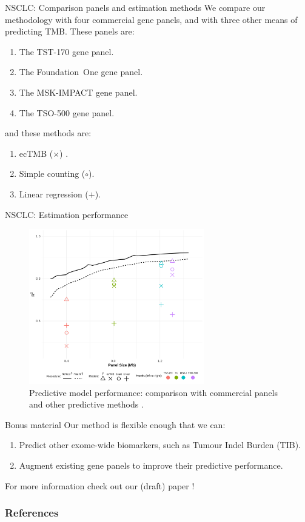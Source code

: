 \documentclass{beamer}
\begin{document}
\begin{frame}{NSCLC: Comparison panels and estimation methods}
We compare our methodology with four commercial gene panels, and with three other means of predicting TMB. These panels are:
\begin{enumerate}
\item The \color{red} TST-170 \color{black} gene panel.
\item The \color{green} Foundation~One \color{black} gene panel.
\item The \color{blue} MSK-IMPACT \color{black} gene panel.
\item The \color{purple} TSO-500 \color{black} gene panel.
\end{enumerate}
and these methods are:
\begin{enumerate}
    \item ecTMB  ($\times$) \citep{yao_ectmb_2020}.
    \item Simple counting ($\circ$).
    \item Linear regression ($+$).
\end{enumerate}

\end{frame}




\begin{frame}{NSCLC: Estimation performance}

\begin{figure}[htbp]
\centering
\includegraphics[width=3in]{figures/originalpanelcomparison.png}
\caption{Predictive model performance: comparison with commercial panels and other predictive methods \citep{bradley_data-driven_2021, yao_ectmb_2020}. \label{fig:7}}
\end{figure}
\end{frame}

\begin{frame}{Bonus material}
Our method is flexible enough that we can:
\begin{enumerate}
    \item Predict other exome-wide biomarkers, such as Tumour Indel Burden (TIB).
    \item Augment existing gene panels to improve their predictive performance.
\end{enumerate}
For more information check out our (draft) paper \cite{bradley_data-driven_2021}!
\end{frame}

\appendix
\begin{frame}[allowframebreaks]
        \frametitle{References}
        
\end{frame}
\end{document}
